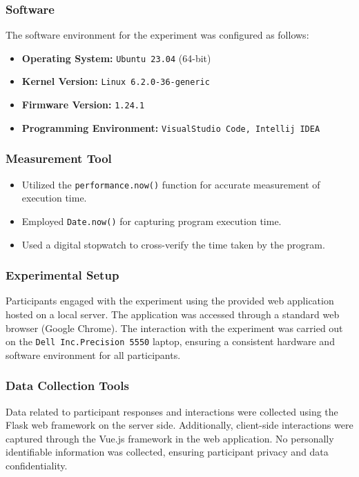 \documentclass{article}
\begin{document}
\subsubsection*{Software}
The software environment for the experiment was configured as follows:
\begin{itemize}
  \item \textbf{Operating System:} \texttt{Ubuntu 23.04} (64-bit)
  \item \textbf{Kernel Version:} \texttt{Linux 6.2.0-36-generic}
  \item \textbf{Firmware Version:} \texttt{1.24.1}
  \item \textbf{Programming Environment:} \texttt{VisualStudio Code, Intellij IDEA}
\end{itemize}

\subsubsection*{Measurement Tool}
    \begin{itemize}
      \item Utilized the \texttt{performance.now()} function for accurate measurement of execution time.
      \item Employed \texttt{Date.now()} for capturing program execution time.
      \item Used a digital stopwatch to cross-verify the time taken by the program.
    \end{itemize}

\subsubsection*{Experimental Setup}
Participants engaged with the experiment using the provided web application hosted on a local server. The application was accessed through a standard web browser (Google Chrome). The interaction with the experiment was carried out on the \texttt{Dell Inc.Precision 5550} laptop, ensuring a consistent hardware and software environment for all participants.

\subsubsection*{Data Collection Tools}
Data related to participant responses and interactions were collected using the Flask web framework on the server side. Additionally, client-side interactions were captured through the Vue.js framework in the web application. No personally identifiable information was collected, ensuring participant privacy and data confidentiality.
\end{document}
